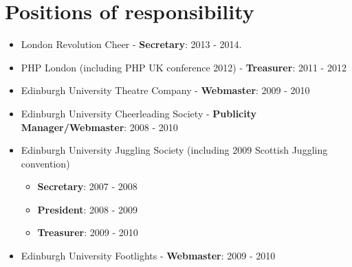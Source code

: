 \documentclass[a4paper]{article}
\begin{document}
\section*{Positions of responsibility}

\begin{itemize}
\item London Revolution Cheer - {\bf Secretary}: 2013 - 2014.
\item PHP London (including PHP UK conference 2012) - {\bf Treasurer}: 2011 - 2012
\item Edinburgh University Theatre Company - {\bf Webmaster}: 2009 - 2010
\item Edinburgh University Cheerleading Society - {\bf Publicity Manager/Webmaster}: 2008 - 2010
\item Edinburgh University Juggling Society (including 2009 Scottish Juggling convention)
	\begin{itemize}
	\item {\bf Secretary}: 2007 - 2008
	\item {\bf President}: 2008 - 2009
	\item {\bf Treasurer}: 2009 - 2010
	\end{itemize}
\item Edinburgh University Footlights - {\bf Webmaster}: 2009 - 2010
\end{itemize}
\end{document}
